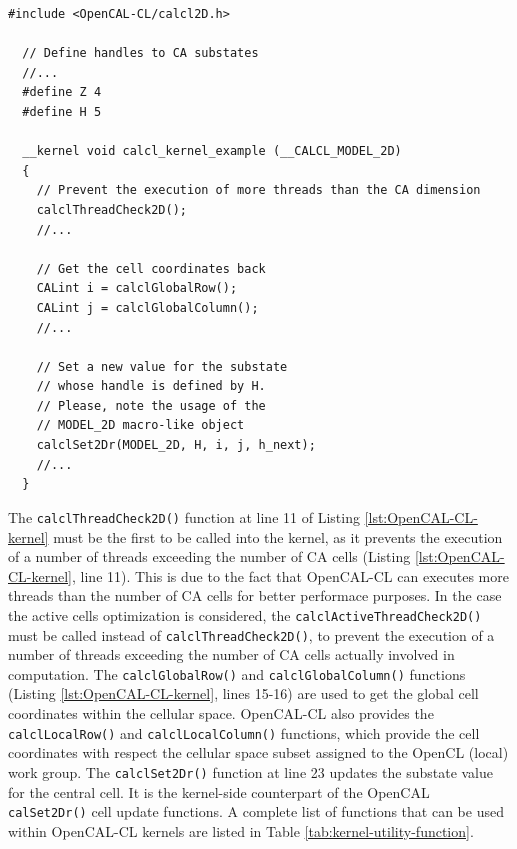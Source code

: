 \begin{lstlisting}[float,floatplacement=H, label=lst:OpenCAL-CL-kernel, caption=Example of OpenCAL-CL kernel.]
  #include <OpenCAL-CL/calcl2D.h>

  // Define handles to CA substates
  //...
  #define Z 4
  #define H 5

  __kernel void calcl_kernel_example (__CALCL_MODEL_2D)
  {
    // Prevent the execution of more threads than the CA dimension
    calclThreadCheck2D();
    //...

    // Get the cell coordinates back
    CALint i = calclGlobalRow();
    CALint j = calclGlobalColumn();
    //...

    // Set a new value for the substate
    // whose handle is defined by H.
    // Please, note the usage of the
    // MODEL_2D macro-like object
    calclSet2Dr(MODEL_2D, H, i, j, h_next);
    //...
  }
\end{lstlisting}

The \verb'calclThreadCheck2D()' function at line 11 of Listing
\ref{lst:OpenCAL-CL-kernel} must be the first to be called into the
kernel, as it prevents the execution of a number of threads exceeding
the number of CA cells (Listing \ref{lst:OpenCAL-CL-kernel}, line
11). This is due to the fact that OpenCAL-CL can executes more threads
than the number of CA cells for better performace purposes. In the
case the active cells optimization is considered, the
\verb'calclActiveThreadCheck2D()' must be called instead of
\verb'calclThreadCheck2D()', to prevent the execution of a number of
threads exceeding the number of CA cells actually involved in
computation. The \verb'calclGlobalRow()' and
\verb'calclGlobalColumn()' functions (Listing
\ref{lst:OpenCAL-CL-kernel}, lines 15-16) are used to get the global
cell coordinates within the cellular space. OpenCAL-CL also provides
the \verb'calclLocalRow()' and \verb'calclLocalColumn()' functions,
which provide the cell coordinates with respect the cellular space
subset assigned to the OpenCL (local) work group. The
\verb'calclSet2Dr()' function at line 23 updates the substate value
for the central cell. It is the kernel-side counterpart of the OpenCAL
\verb'calSet2Dr()' cell update functions. A complete list of functions
that can be used within OpenCAL-CL kernels are listed in Table
\ref{tab:kernel-utility-function}.


